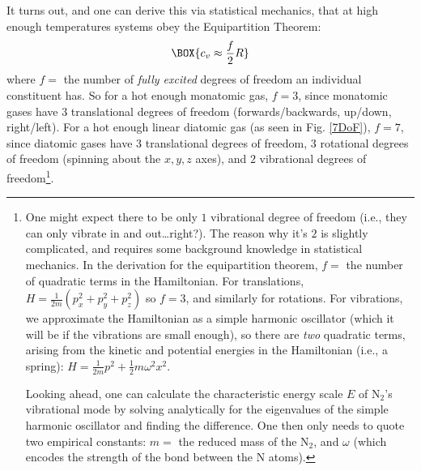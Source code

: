 It turns out, and one can derive this via statistical mechanics, that at high enough temperatures systems obey the Equipartition Theorem:
\begin{align}
    \label{Equipartition Eqn}
    \BOX{c_v\approx\frac{f}{2}R}
\end{align}
where $f=$ the number of \textit{fully excited} degrees of freedom an individual constituent has. So for a hot enough monatomic gas, $f=3$, since monatomic gases have $3$ translational degrees of freedom (forwards/backwards, up/down, right/left). For a hot enough linear diatomic gas (as seen in Fig. \ref{7DoF}), $f=7$, since diatomic gases have $3$ translational degrees of freedom, $3$ rotational degrees of freedom (spinning about the $x,y,z$ axes), and $2$ vibrational degrees of freedom\footnote{
    One might expect there to be only $1$ vibrational degree of freedom (i.e., they can only vibrate in and out\ldots right?). The reason why it's $2$ is slightly complicated, and requires some background knowledge in statistical mechanics. In the derivation for the equipartition theorem, $f= $ the number of quadratic terms in the Hamiltonian. For translations, $H=\frac{1}{2m}\left(p_x^2+p_y^2+p_z^2\right)$ so $f=3$, and similarly for rotations. For vibrations, we approximate the Hamiltonian as a simple harmonic oscillator (which it will be if the vibrations are small enough), so there are \textit{two} quadratic terms, arising from the kinetic and potential energies in the Hamiltonian (i.e., a spring): $H=\frac{1}{2m}p^2+\frac{1}{2}m\omega^2x^2$.

    Looking ahead, one can calculate the characteristic energy scale $E$ of N$_2$'s vibrational mode by solving analytically for the eigenvalues of the simple harmonic oscillator and finding the difference. One then only needs to quote two empirical constants: $m=$ the reduced mass of the N$_2$, and $\omega$ (which encodes the strength of the bond between the N atoms). 
}.

